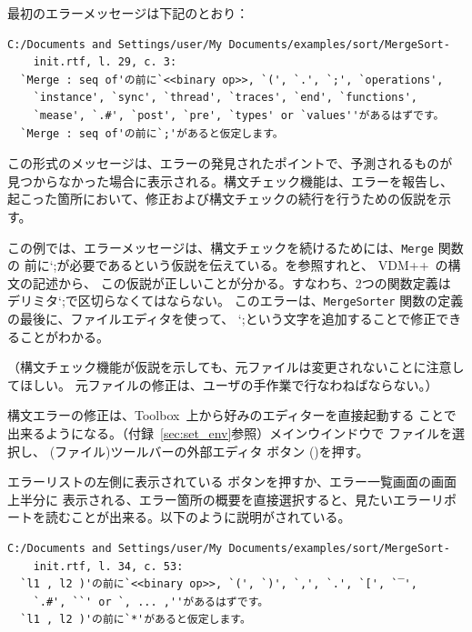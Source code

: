 \documentclass[\pformat,12pt]{jarticle}
\newcommand{\vdmslpp}{VDM++}
\newcommand{\Toolbox}{Toolbox}
\newcommand{\Lit}[1]{`#1\Quote}
\newcommand{\aaa}{\tt }
\newcommand{\guicmd}[1]{{\gt #1}}
\begin{document}
\newpage

最初のエラーメッセージは下記のとおり：

\begin{verbatim}
C:/Documents and Settings/user/My Documents/examples/sort/MergeSort-
    init.rtf, l. 29, c. 3:
  `Merge : seq of'の前に`<<binary op>>, `(', `.', `;', `operations',
    `instance', `sync', `thread', `traces', `end', `functions',
    `mease', `.#', `post', `pre', `types' or `values''があるはずです。
  `Merge : seq of'の前に`;'があると仮定します。
\end{verbatim}

この形式のメッセージは、エラーの発見されたポイントで、予測されるものが
見つからなかった場合に表示される。構文チェック機能は、エラーを報告し、
起こった箇所において、修正および構文チェックの続行を行うための仮説を示す。

この例では、エラーメッセージは、構文チェックを続けるためには、{\aaa Merge} 関数の
前に\Lit{;}が必要であるという仮説を伝えている。\cite{LangManPP-SCSK}を参照すれと、
\vdmslpp\  の構文の記述から、 この仮説が正しいことが分かる。すなわち、2つの関数定義は
デリミタ\Lit{;}で区切らなくてはならない。
このエラーは、{\aaa MergeSorter} 関数の定義の最後に、ファイルエディタを使って、
\Lit{;}という文字を追加することで修正できることがわかる。

（構文チェック機能が仮説を示しても、元ファイルは変更されないことに注意してほしい。
元ファイルの修正は、ユーザの手作業で行なわねばならない。）

構文エラーの修正は、\Toolbox\ 上から好みのエディターを直接起動する
ことで出来るようになる。（付録~\ref{sec:set_env}参照）メインウインドウで
ファイルを選択し、
(\guicmd{ファイル})ツールバーの\guicmd{外部エディタ} ボタン
()を押す。

エラーリストの左側に表示されている {\fbox{\tt >}}ボタンを押すか、\guicmd{エラー一覧}画面の画面上半分に
表示される、エラー箇所の概要を直接選択すると、見たいエラーリポートを読むことが出来る。以下のように説明がされている。


\begin{verbatim}
C:/Documents and Settings/user/My Documents/examples/sort/MergeSort-
    init.rtf, l. 34, c. 53:
  `l1 , l2 )'の前に`<<binary op>>, `(', `)', `,', `.', `[', `‾',
    `.#', ``' or `, ... ,''があるはずです。
  `l1 , l2 )'の前に`*'があると仮定します。
\end{verbatim}
\end{document}
